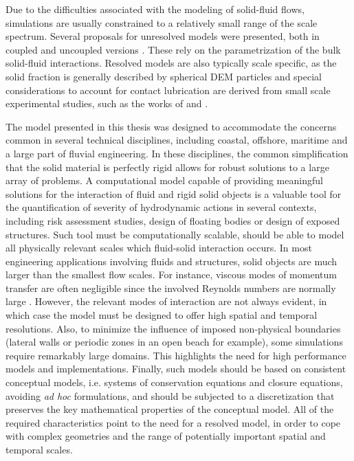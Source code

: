 Due to the difficulties associated with the modeling of solid-fluid flows, simulations are usually constrained to a relatively small range of the scale spectrum. Several proposals for unresolved models were presented, both in coupled and uncoupled versions \citep{Calantoni-2004, Robinson-2014, Cleary-2014}. These rely on the parametrization of the bulk solid-fluid interactions. Resolved models are also typically scale specific, as the solid fraction is generally described by spherical \ac{DEM} particles \citep{Potapov-2001, Kempe-2012} and special considerations to account for contact lubrication are derived from small scale experimental studies, such as the works of \cite{Yang-2006} and \cite{Joseph-2001}. 

The model presented in this thesis was designed to accommodate the concerns common in several technical disciplines, including coastal, offshore, maritime and a large part of fluvial engineering. In these disciplines, the common simplification that the solid material is perfectly rigid allows for robust solutions to a large array of problems. A computational model capable of providing meaningful solutions for the interaction of fluid and rigid solid objects is a valuable tool for the quantification of severity of hydrodynamic actions in several contexts, including risk assessment studies, design of floating bodies or design of exposed structures. Such tool must be computationally scalable, should be able to model all physically relevant scales which fluid-solid interaction occurs. In most engineering applications involving fluids and structures, solid objects are much larger than the smallest flow scales. For instance, viscous modes of momentum transfer are often negligible since the involved Reynolds numbers are normally large \citep{Shu-2011}. However, the relevant modes of interaction are not always evident, in which case the model must be designed to offer high spatial and temporal resolutions. Also, to minimize the influence of imposed non-physical boundaries (lateral walls or periodic zones in an open beach for example), some simulations require remarkably large domains. This highlights the need for high performance models and implementations. Finally, such models should be based on consistent conceptual models, i.e. systems of conservation equations and closure equations, avoiding \emph{ad hoc} formulations, and should be subjected to a discretization that preserves the key mathematical properties of the conceptual model. All of the required characteristics point to the need for a resolved model, in order to cope with complex geometries and the range of potentially important spatial and temporal scales.

